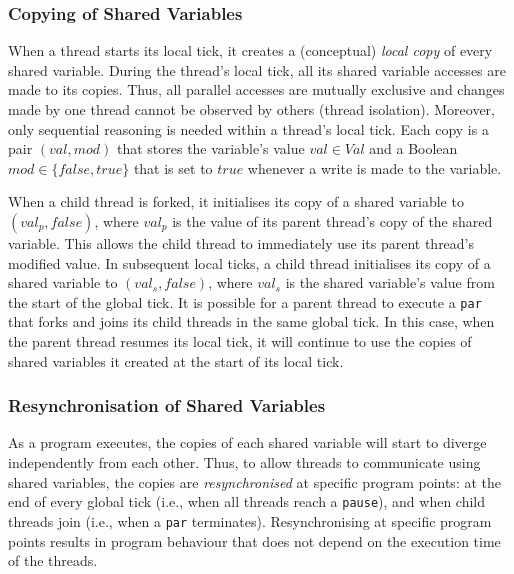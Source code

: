 \subsubsection{Copying of Shared Variables}
\label{sec:forec_shared_variables_copying}
When a thread starts its local tick, it creates a (conceptual) \emph{local copy} of every shared 
variable. During the thread's local tick, all its shared variable accesses are made to its 
copies. Thus, all parallel accesses are mutually exclusive and changes made by one thread 
cannot be observed by others (thread isolation). Moreover, only sequential reasoning is needed 
within a thread's local tick. Each copy is a pair $(\mathit{val}, \mathit{mod})$ that stores 
the variable's value $\mathit{val} \in \mathit{Val}$ and a Boolean 
$\mathit{mod} \in \{\mathit{false}, \mathit{true}\}$ that is set to $\mathit{true}$ 
whenever a write is made to the variable.

When a child thread is forked, it initialises its copy of a shared variable to 
$(\mathit{val_p}, \mathit{false})$, where $\mathit{val_p}$ is the value of its
parent thread's copy of the shared variable. This allows the child thread to 
immediately use its parent thread's modified value.
In subsequent local ticks, a child thread initialises its copy of a shared variable to
$(\mathit{val_s}, \mathit{false})$, where $\mathit{val_s}$ is the shared variable's 
value from the start of the global tick.
It is possible for a parent thread to execute a \verb$par$ that forks and joins its child
threads in the same global tick. In this case, when the parent thread resumes its local tick, 
it will continue to use the copies of shared variables it created at the start 
of its local tick.

\subsubsection{Resynchronisation of Shared Variables}
\label{sec:forec_shared_variables_resync}
As a program executes, the copies of each shared variable will start to diverge independently 
from each other. Thus, to allow threads to communicate using shared variables, the 
copies are \emph{resynchronised} at specific 
program points: at the end of every global tick (i.e., when all threads reach a \verb$pause$), and 
when child threads join (i.e., when a \verb$par$ terminates). Resynchronising at specific program 
points results in program behaviour that does not depend on the execution time of the threads.

